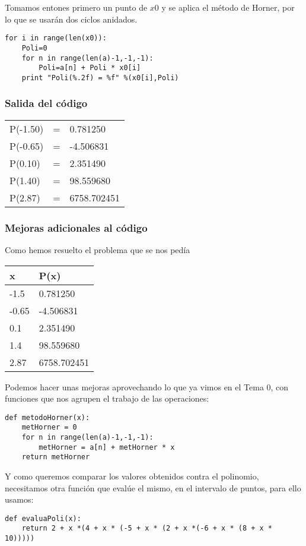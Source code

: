 \documentclass[12pt]{beamer}
\begin{document}
\begin{frame}[fragile]
Tomamos entones primero un punto de $x0$ y se aplica el m\'{e}todo de Horner, por lo que se usar\'{a}n dos ciclos anidados.
\begin{lstlisting}
for i in range(len(x0)):
    Poli=0
    for n in range(len(a)-1,-1,-1):
        Poli=a[n] + Poli * x0[i]
    print "Poli(%.2f) = %f" %(x0[i],Poli)
\end{lstlisting}
\end{frame}
\begin{frame}[fragile]
\frametitle{Salida del c\'{o}digo}
\begin{tabular}{l c l}
P(-1.50) & = &  0.781250 \\
P(-0.65) & = & -4.506831 \\
P(0.10) & = &  2.351490 \\
P(1.40) & =  & 98.559680 \\
P(2.87) & = & 6758.702451
\end{tabular}
\end{frame}
\begin{frame}[fragile]
\frametitle{Mejoras adicionales al c\'{o}digo}
Como hemos resuelto el problema que se nos ped\'{i}a
\\
\medskip
\begin{center}
\begin{tabular}{l @{} | l}
x & P(x) \\
\hline -1.5 & 0.781250 \\
\hline -0.65 & -4.506831 \\
\hline 0.1 & 2.351490 \\
\hline 1.4 & 98.559680 \\
\hline 2.87 & 6758.702451
\end{tabular}
\end{center}
\end{frame}
\begin{frame}[fragile]
Podemos hacer unas mejoras aprovechando lo que ya vimos en el Tema 0, con funciones que nos agrupen el trabajo de las operaciones:
\begin{lstlisting}
def metodoHorner(x):
    metHorner = 0
    for n in range(len(a)-1,-1,-1):     
        metHorner = a[n] + metHorner * x
    return metHorner
\end{lstlisting}
\end{frame}
\begin{frame}[fragile]
Y como queremos comparar los valores obtenidos contra el polinomio, necesitamos otra funci\'{o}n que eval\'{u}e el mismo, en el intervalo de puntos, para ello usamos:
\begin{lstlisting}
def evaluaPoli(x):
    return 2 + x *(4 + x * (-5 + x * (2 + x *(-6 + x * (8 + x * 10)))))
\end{lstlisting}
\end{frame}
\end{document}
